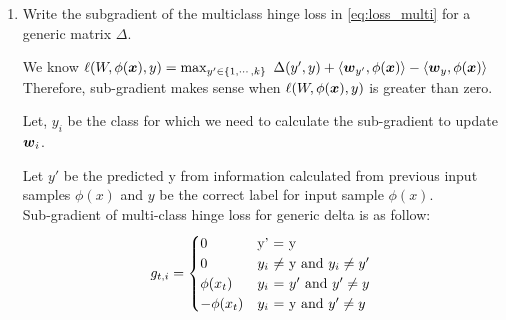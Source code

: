 \documentclass{article}
\begin{document}
\begin{enumerate}[label=(\alph*)]
\item Write the subgradient of the multiclass hinge loss in \eqref{eq:loss_multi} for a generic matrix $\Delta$.
\begin{mdframed}[backgroundcolor=lightgray]
\begin{itemize}
    We know $\ell(W,\phi(\boldsymbol{x}),y)=\max_{y' \in \{1, \cdots, k\}} \ \Delta(y', y) + \langle \boldsymbol{w}_{y'}, \phi(\boldsymbol{x})\rangle  - \langle\boldsymbol{w}_y, \phi(\boldsymbol{x}) \rangle$\\
    
    Therefore, sub-gradient makes sense when $\ell(W,\phi(\boldsymbol{x}),y)$ is greater than zero.
    
    Let, $y_i$ be the class for which we need to calculate the sub-gradient to update $\boldsymbol{w}_i$.
    
    Let $y'$ be the predicted y from information calculated from previous input samples $\phi(x)$ and $y$ be the correct label for input sample $\phi(x)$.\\
    
    Sub-gradient of multi-class hinge loss for generic delta is as follow:
                \begin{equation}
                    g_{t,i} = \begin{cases} 
                    0 & \text{y' = y} \\
                    0 & \text{$y_i$ $\neq$ y and $y_i \neq y'$} \\
                    \phi(x_t) & \text{$y_i$ = $y'$ and $y' \neq y$}\\
                    -\phi(x_t) & \text{$y_i$ = y and $y' \neq y$} \\
                    \end{cases}\\
                \end{equation}
            \end{itemize}
\end{mdframed}

\end{enumerate}
\end{document}
